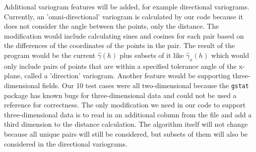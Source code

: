 Additional variogram features will be added, for example directional variograms. Currently, an 'omni-directional' variogram is calculated by our code because it does not consider the angle between the points, only the distance. The modification would include calculating sines and cosines for each pair based on the differences of the coordinates of the points in the pair. The result of the program would be the current $\hat{\gamma}(h)$ plus subsets of it like $\hat{\gamma}_x(h)$ which would only include pairs of points that are within a specified tolerance angle of the x-plane, called a 'direction' variogram. Another feature would be supporting three-dimensional fields. Our 10 test cases were all two-dimensional because the \texttt{gstat} package has known bugs for three-dimensional data and could not be used a reference for correctness. The only modification we need in our code to support three-dimensional data is to read in an additional column from the file and add a third dimension to the distance calculation. The algorithm itself will not change because all unique pairs will still be considered, but subsets of them will also be considered in the directional variograms. 


